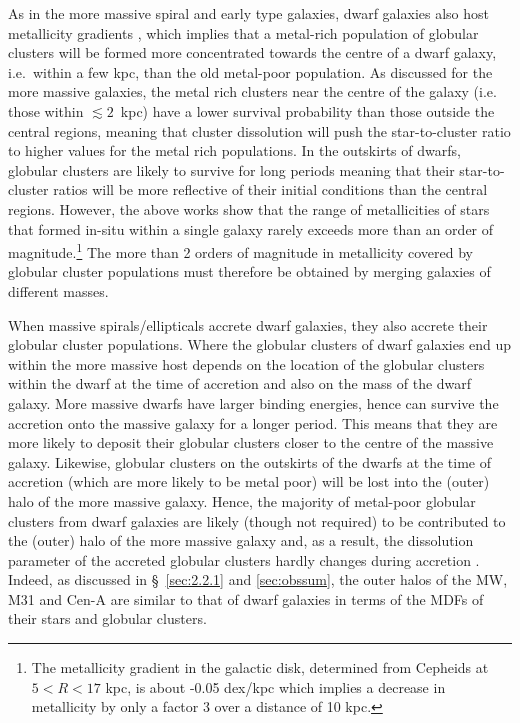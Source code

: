 \documentclass{aa}
\begin{document}
As in the more massive spiral and early type galaxies, dwarf galaxies also host metallicity gradients \citep{tolstoy04, battaglia06, battaglia11, kirby11, kirby12}, which implies that a metal-rich population of globular clusters will be formed more concentrated towards the centre of a dwarf galaxy, i.e.~within a few kpc, than the old metal-poor population.  As discussed for the more massive galaxies, the metal rich clusters near the centre of the galaxy (i.e. those within $\lesssim2$~kpc) have a lower survival probability than those outside the central regions, meaning that cluster dissolution will push the star-to-cluster ratio to higher values for the metal rich populations.  In the outskirts of dwarfs, globular clusters are likely to survive for long periods meaning that their star-to-cluster ratios will be more reflective of their initial conditions than the central regions. However, the above works show that the range of metallicities of stars that formed in-situ within a single galaxy rarely exceeds more than an order of magnitude.\footnote{The metallicity gradient in the galactic disk, determined from Cepheids at $5 < R < 17$ kpc, is about -0.05 dex/kpc \citep{lemasle08} which implies a decrease in metallicity by only a factor 3 over a distance of 10 kpc.}  The more than 2 orders of magnitude in metallicity covered by globular cluster populations must therefore be obtained by merging galaxies of different masses.

When massive spirals/ellipticals accrete dwarf galaxies, they also accrete their globular cluster populations.  Where the globular clusters of dwarf galaxies end up within the more massive host depends on the location of the globular clusters within the dwarf at the time of accretion and also on the mass of the dwarf galaxy.  More massive dwarfs have larger binding energies, hence can survive the accretion onto the massive galaxy for a longer period.  This means that they are more likely to deposit their globular clusters closer to the centre of the massive galaxy.  Likewise, globular clusters on the outskirts of the dwarfs at the time of accretion (which are more likely to be metal poor) will be lost into the (outer) halo of the more massive galaxy.  Hence, the majority of metal-poor globular clusters from dwarf galaxies are likely (though not required) to be contributed to the (outer) halo of the more massive galaxy and, as a result, the dissolution parameter of the accreted globular clusters hardly changes during accretion \citep[e.g.][]{rieder13}. Indeed, as discussed in \S~\ref{sec:2.2.1} and \ref{sec:obssum}, the outer halos of the MW, M31 and Cen-A are similar to that of dwarf galaxies in terms of the MDFs of their stars and globular clusters.
\end{document}
